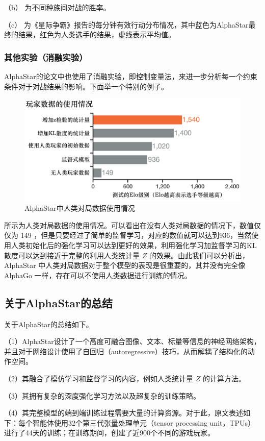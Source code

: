 （b） 为不同种族间对战的胜率。

（c） 为《星际争霸\uppercase\expandafter{}》报告的每分钟有效行动分布情况，其中蓝色为AlphaStar最终的结果，红色为人类选手的结果，虚线表示平均值。

\subsubsection{其他实验（消融实验）} 

AlphaStar的论文中也使用了消融实验，即控制变量法，来进一步分析每一个约束条件对于对战结果的影响。下面举一个特别的例子。

\begin{figure}[htb]
    \centering
    \includegraphics[width=0.5\linewidth]{res/ch13/13.8}
    \caption{AlphaStar中人类对局数据使用情况}
    \label{fig:13_8}
\end{figure}

 所示为人类对局数据的使用情况。可以看出在没有人类对局数据的情况下，数值仅仅为 149 ，但是只要经过了简单的监督学习，对应的数值就可以达到936，当然使用人类初始化后的强化学习可以达到更好的效果，利用强化学习加监督学习的KL散度可以达到接近于完整的利用人类统计量 $Z$ 的效果。由此我们可以分析出，AlphaStar 中人类对局数据对于整个模型的表现是很重要的，其并没有完全像 AlphaGo 一样，存在可以不使用人类数据进行训练的情况。

\subsection{关于AlphaStar的总结} 

关于AlphaStar的总结如下。

（1）AlphaStar设计了一个高度可融合图像、文本、标量等信息的神经网络架构，并且对于网络设计使用了自回归（autoregressive）技巧，从而解耦了结构化的动作空间。

（2）其融合了模仿学习和监督学习的内容，例如人类统计量 $Z$ 的计算方法。

（3）其拥有复杂的深度强化学习方法以及超复杂的训练策略。

（4）其完整模型的端到端训练过程需要大量的计算资源。对于此，原文表述如下：每个智能体使用32个第三代张量处理单元（tensor processing unit，TPUs）进行了44天的训练；在训练期间，创建了近900个不同的游戏玩家。





